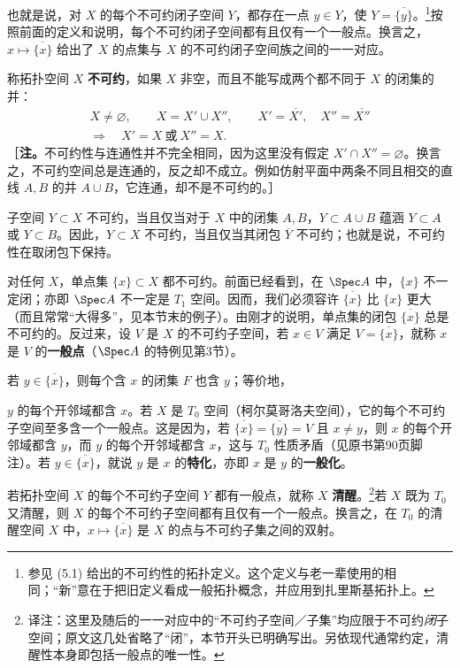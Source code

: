 也就是说，对 $X$ 的每个不可约闭子空间 $Y$，都存在一点 $y\in Y$，使 $Y=\overline{\{y\}}$。\footnote{参见 (5.1) 给出的不可约性的拓扑定义。这个定义与老一辈使用的相同；“新”意在于把旧定义看成一般拓扑概念，并应用到扎里斯基拓扑上。}按照前面的定义和说明，每个不可约闭子空间都有且仅有一个一般点。换言之，$x\mapsto\overline{\{x\}}$ 给出了 $X$ 的点集与 $X$ 的不可约闭子空间族之间的一一对应。

称拓扑空间 $X$ \textbf{不可约}，如果 $X$ 非空，而且不能写成两个都不同于 $X$ 的闭集的并：
\begin{equation}\tag{5.1}
\begin{gathered}
X\ne\varnothing,\qquad X=X'\cup X'',\qquad
X'=\overline{X'},\quad X''=\overline{X''}\\
\Longrightarrow\quad X'=X\ \text{或}\ X''=X.
\end{gathered}
\end{equation}
［\textbf{注。}不可约性与连通性并不完全相同，因为这里没有假定 $X'\cap X''=\varnothing$。换言之，不可约空间总是连通的，反之却不成立。例如仿射平面中两条不同且相交的直线 $A,B$ 的并 $A\cup B$，它连通，却不是不可约的。］

子空间 $Y\subset X$ 不可约，当且仅当对于 $X$ 中的闭集 $A,B$，$Y\subset A\cup B$ 蕴涵 $Y\subset A$ 或 $Y\subset B$。因此，$Y\subset X$ 不可约，当且仅当其闭包 $\overline Y$ 不可约；也就是说，不可约性在取闭包下保持。

对任何 $X$，单点集 $\{x\}\subset X$ 都不可约。前面已经看到，在 $\Spec A$ 中，$\{x\}$ 不一定闭；亦即 $\Spec A$ 不一定是 $T_1$ 空间。因而，我们必须容许 $\overline{\{x\}}$ 比 $\{x\}$ 更大（而且常常“大得多”，见本节末的例子）。由刚才的说明，单点集的闭包 $\overline{\{x\}}$ 总是不可约的。反过来，设 $V$ 是 $X$ 的不可约子空间，若 $x\in V$ 满足 $V=\overline{\{x\}}$，就称 $x$ 是 $V$ 的\textbf{一般点}（$\Spec A$ 的特例见第3节）。

若 $y\in\overline{\{x\}}$，则每个含 $x$ 的闭集 $F$ 也含 $y$；等价地，

$y$ 的每个开邻域都含 $x$。若 $X$ 是 $T_0$ 空间（柯尔莫哥洛夫空间），它的每个不可约子空间至多含一个一般点。这是因为，若 $\overline{\{x\}}=\overline{\{y\}}=V$ 且 $x\ne y$，则 $x$ 的每个开邻域都含 $y$，而 $y$ 的每个开邻域都含 $x$，这与 $T_0$ 性质矛盾（见原书第90页脚注）。若 $y\in\overline{\{x\}}$，就说 $y$ 是 $x$ 的\textbf{特化}，亦即 $x$ 是 $y$ 的\textbf{一般化}。

若拓扑空间 $X$ 的每个不可约子空间 $Y$ 都有一般点，就称 $X$ \textbf{清醒}。\footnote{译注：这里及随后的一一对应中的“不可约子空间／子集”均应限于不可约\emph{闭}子空间；原文这几处省略了“闭”，本节开头已明确写出。另依现代通常约定，清醒性本身即包括一般点的唯一性。}若 $X$ 既为 $T_0$ 又清醒，则 $X$ 的每个不可约子空间都有且仅有一个一般点。换言之，在 $T_0$ 的清醒空间 $X$ 中，$x\mapsto\overline{\{x\}}$ 是 $X$ 的点与不可约子集之间的双射。

